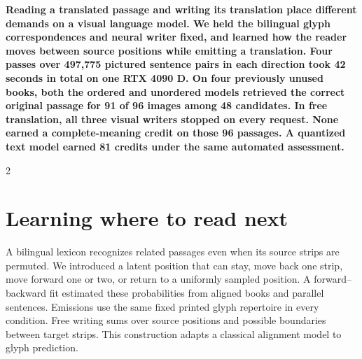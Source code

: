\noindent\textbf{Reading a translated passage and writing its translation place different demands on a visual language model. We held the bilingual glyph correspondences and neural writer fixed, and learned how the reader moves between source positions while emitting a translation. Four passes over 497,775 pictured sentence pairs in each direction took 42 seconds in total on one RTX 4090 D. On four previously unused books, both the ordered and unordered models retrieved the correct original passage for 91 of 96 images among 48 candidates. In free translation, all three visual writers stopped on every request. None earned a complete-meaning credit on those 96 passages. A quantized text model earned 81 credits under the same automated assessment.}\par
\begin{multicols}{2}
\section*{Learning where to read next}
A bilingual lexicon recognizes related passages even when its source strips are permuted. We introduced a latent position that can stay, move back one strip, move forward one or two, or return to a uniformly sampled position. A forward--backward fit estimated these probabilities from aligned books and parallel sentences. Emissions use the same fixed printed glyph repertoire in every condition. Free writing sums over source positions and possible boundaries between target strips. This construction adapts a classical alignment model to glyph prediction.\cite{vogel}
\end{multicols}
